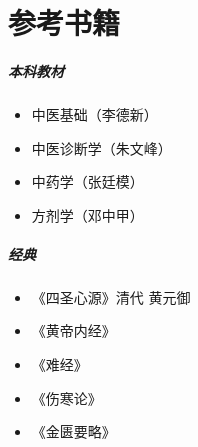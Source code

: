 \chapter{参考书籍}

\paragraph{本科教材}
\begin{itemize}
  \item 中医基础（李德新）
  \item 中医诊断学（朱文峰）
  \item 中药学（张廷模）
  \item 方剂学（邓中甲）
\end{itemize}

\paragraph{经典}
\begin{itemize}
  \item 《四圣心源》清代 黄元御
  \item 《黄帝内经》
  \item 《难经》
  \item 《伤寒论》
  \item 《金匮要略》
\end{itemize}
